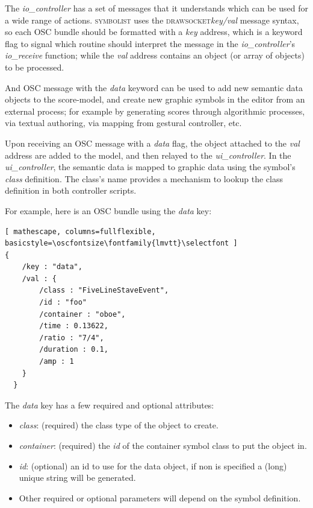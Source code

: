 \documentclass{article}
\def\symbolist{\textsc{symbolist}\xspace}
\def\drawsocket{\textsc{drawsocket}\xspace}
\def\uicontroller{\textit{ui\_controller}\xspace}
\def\iocontroller{\textit{io\_controller}\xspace}
\def\oscfontsize{\footnotesize}
\begin{document}
The \iocontroller has a set of messages that it understands which can be used for a wide range of actions.
\symbolist uses the \drawsocket \textit{key/val} message syntax, so each OSC bundle should be formatted with a \textit{key} address, which is a keyword flag to signal which routine should interpret the message in the \iocontroller's \textit{io\_receive} function; while the \textit{val} address contains an object (or array of objects) to be processed.

And OSC message with the \textit{data} keyword can be used to add new semantic data objects to the score-model, and create new graphic symbols in the editor from an external process;  for example by generating scores through algorithmic processes, via textual authoring, via mapping from gestural controller, etc.

Upon receiving an OSC message with a \textit{data} flag, the object attached to the \textit{val} address are added to the model, and then relayed to the \uicontroller.
In the \uicontroller, the semantic data is mapped to graphic data using the symbol's \textit{class} definition. The class's name provides a mechanism to lookup the class definition in both controller scripts.

For example, here is an OSC bundle using the \textit{data} key:

\begin{lstlisting}[ mathescape, columns=fullflexible, basicstyle=\oscfontsize\fontfamily{lmvtt}\selectfont ]
{
    /key : "data",
    /val : {
        /class : "FiveLineStaveEvent",
        /id : "foo"
        /container : "oboe",
        /time : 0.13622,
        /ratio : "7/4",
        /duration : 0.1,
        /amp : 1
    }
  }
\end{lstlisting}

The \textit{data} key has a few required and optional attributes:
\begin{itemize}\itemsep0pt 
  \item \textit{class}: (required) the class type of the object to create.
  \item \textit{container}: (required) the \textit{id} of the container symbol class to put the object in.
   \item \textit{id}: (optional) an id to use for the data object, if non is specified a (long) unique string will be generated.
  \item Other required or optional parameters will depend on the symbol definition.
\end{itemize}
\end{document}
